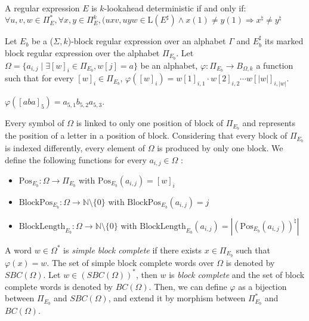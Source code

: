 \documentclass{llncs}
\begin{document}
\begin{lemma}[\cite{HW08}]
	A regular expression $E$ is $k$-lookahead deterministic if and only if:
	$\forall u,v,w \in \Pi_E^*, \forall x,y \in \Pi_E^k, (uxv, uyw \in \mathrm{L}(E^{\sharp}) \wedge x(1) \neq y(1) \Longrightarrow x^{\natural} \neq y^{\natural}$
\end{lemma}


	Let $E_b$ be a ($\Sigma, k$)-block regular expression over an alphabet $\Gamma$ and $E_b^{\sharp}$ its marked block regular expression  over the alphabet $\Pi_{E_b}$.
	Let $\Omega = \{a_{i, j} \mid \exists [w]_i \in \Pi_{E_b}, w[j] = a\}$ be an alphabet, $\varphi : \Pi_{E_b} \rightarrow B_{\Omega, k}$ a function such that for every $[w]_i \in \Pi_{E_b}$, $\varphi([w]_i) = w[1]_{i, 1} \cdot w[2]_{i, 2} \cdots w[|w|]_{i, |w|}$.
	
\begin{example}
	$\varphi([aba]_5) = a_{5, 1}b_{5, 2}a_{5, 3}$.
\end{example}
	
	Every symbol of $\Omega$ is linked to only one position of block of $\Pi_{E_b}$ and represents the position of a letter in a position of block.
	Considering that every block of $\Pi_{E_b}$ is indexed differently, every element of $\Omega$ is produced by only one block.
	We define the following functions for every $a_{i, j} \in \Omega$ :
	\begin{itemize}
		\item $\mathrm{Pos}_{E_b} : \Omega \rightarrow \Pi_{E_b}$ with $\mathrm{Pos}_{E_b}(a_{i, j}) =  [w]_i$
		\item $\mathrm{BlockPos}_{E_b} : \Omega \rightarrow \mathbb{N} \setminus \{0\}$ with $\mathrm{BlockPos}_{E_b}(a_{i, j}) = j$
		\item $\mathrm{BlockLength}_{E_b} : \Omega \rightarrow \mathbb{N} \setminus \{0\}$ with $\mathrm{BlockLength}_{E_b}(a_{i, j}) = |(\mathrm{Pos}_{E_b}(a_{i, j}))^{\natural}|$
	\end{itemize}
	
	A word $w \in \Omega^*$ is \emph{simple block complete} if there exists $x \in \Pi_{E_b}$ such that $\varphi(x) = w$.
	The set of simple block complete words over $\Omega$ is denoted by $SBC(\Omega)$.
	Let $w \in (SBC(\Omega))^*$, then $w$ is \emph{block complete} and the set of block complete words is denoted by $BC(\Omega)$.
	Then, we can define $\varphi$ as a bijection between $\Pi_{E_b}$ and $SBC(\Omega)$, and extend it by morphism between $\Pi_{E_b}^*$ and $BC(\Omega)$.
	
\end{document}
